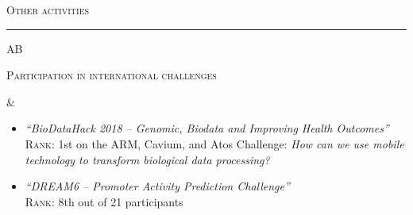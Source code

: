 \documentclass[a4paper,10pt]{article}
\newcommand{\mediumtitle}[1]{
	\vspace{0.2cm}
	{\noindent
	\Large \textsc{#1}\\[-2ex]
	\hrule
	\vspace{0.2cm}}
}
\newenvironment{doubletablelist}
{
	\vspace{-0.2cm}
	\begin{longtable}[!h]{AB}}{\end{longtable}
}
\newcommand{\dtlist}[2]{
\hspace{-3cm}
\noindent
	\begin{minipage}{0.22\textwidth}
	\begin{flushright}
	\textsc{#1}
	\end{flushright}
	\end{minipage}
	& #2\\[0.2cm]
}
\newcommand{\graybulletitem}{ \item[\textcolor{gray}{$\bullet$}]}
\newcommand{\minusitem}{\item[-]}
\begin{document}

\mediumtitle{Other activities}

\begin{doubletablelist}


%
%
%


\dtlist{Participation in international challenges}{
	\vspace{-1.0cm}
	\begin{itemize} %
		\graybulletitem   \begin{minipage}[t]{0.65\textwidth}
			\emph{``BioDataHack 2018 -- Genomic, Biodata and Improving Health Outcomes''}\\
			\textsc{Rank:} 1st on the ARM, Cavium, and Atos Challenge: \emph{How can we use mobile technology to transform biological data processing?}
		\end{minipage}
	
		\graybulletitem  \begin{minipage}[t]{0.65\textwidth}
			\emph{``DREAM6 -- Promoter Activity Prediction Challenge''}\\
			\textsc{Rank:} 8th out of 21 participants
		\end{minipage}


\end{itemize}}
\end{doubletablelist}
\end{document}
